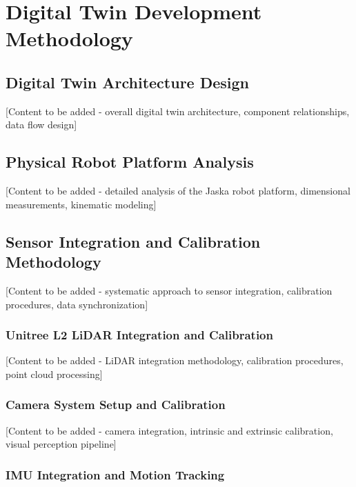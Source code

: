 \vspace{21.5pt}
\chapter{Digital Twin Development Methodology}

\section{Digital Twin Architecture Design}

[Content to be added - overall digital twin architecture, component relationships, data flow design]

\section{Physical Robot Platform Analysis}

[Content to be added - detailed analysis of the Jaska robot platform, dimensional measurements, kinematic modeling]

\section{Sensor Integration and Calibration Methodology}

[Content to be added - systematic approach to sensor integration, calibration procedures, data synchronization]

\subsection{Unitree L2 LiDAR Integration and Calibration}

[Content to be added - LiDAR integration methodology, calibration procedures, point cloud processing]

\subsection{Camera System Setup and Calibration}

[Content to be added - camera integration, intrinsic and extrinsic calibration, visual perception pipeline]

\subsection{IMU Integration and Motion Tracking}

